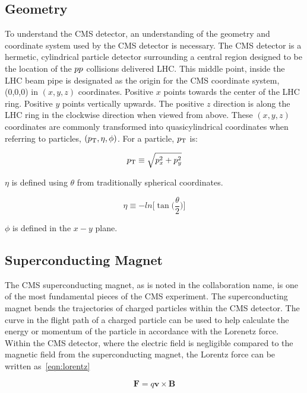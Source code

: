 \subsection{Geometry}
To understand the CMS detector, an understanding of the geometry and coordinate system used by the 
CMS detector is necessary. The CMS detector is a hermetic, cylindrical particle detector surrounding
a central region designed to be the location of the $pp$ collisions delivered LHC. This middle
point, inside the LHC beam pipe is designated as the origin for the CMS coordinate system, (0,0,0) in
$(x, y, z)$ coordinates. Positive $x$ points towards the center of the LHC ring.
Positive $y$ points vertically upwards. The positive $z$ direction is along the LHC ring in the
clockwise direction when viewed from above. These $(x, y, z)$ coordinates are commonly transformed
into quasicylindrical coordinates when referring to particles, $(p_\mathrm{T}, \eta, \phi)$. For a particle,
$p_\mathrm{T}$ is:

\begin{equation}
p_\mathrm{T} \equiv \sqrt{p^{2}_{x} + p^{2}_{y}}
\end{equation}

$\eta$ is defined using $\theta$ from traditionally spherical coordinates.

\begin{equation}
\eta \equiv -ln\bigg[\tan\bigg(\frac{\theta}{2}\bigg)\bigg]
\end{equation}

$\phi$ is defined in the $x-y$ plane.



\subsection{Superconducting Magnet}
The CMS superconducting magnet, as is noted in the collaboration name, is one of the most fundamental
pieces of the CMS experiment. The superconducting magnet bends the trajectories of charged particles
within the CMS detector. The curve in the flight path of a charged particle can be used to help
calculate the energy or momentum of the particle in accordance with the Lorenetz force.
Within the CMS detector, where the electric field is negligible compared to the magnetic field
from the superconducting magnet, the Lorentz force can be written as~\ref{eqn:lorentz}

\begin{equation}
\textbf{F} = q\textbf{v} \times \textbf{B}
\label{eqn:lorentz}
\end{equation}

